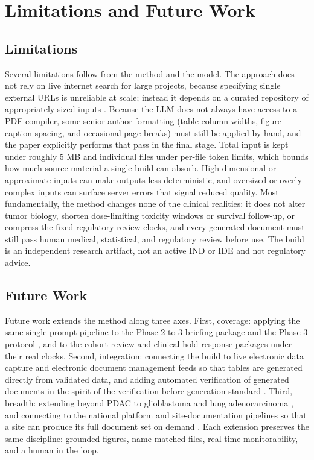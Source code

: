 \section{Limitations and Future Work}

\subsection{Limitations}

Several limitations follow from the method and the model. The approach does not rely
on live internet search for large projects, because specifying single external URLs
is unreliable at scale; instead it depends on a curated repository of appropriately
sized inputs \cite{adoptionguide}. Because the LLM does not always have access to a
PDF compiler, some senior-author formatting (table column widths, figure-caption
spacing, and occasional page breaks) must still be applied by hand, and the paper
explicitly performs that pass in the final stage. Total input is kept under roughly
5 MB and individual files under per-file token limits, which bounds how much source
material a single build can absorb. High-dimensional or approximate inputs can make
outputs less deterministic, and oversized or overly complex inputs can surface server
errors that signal reduced quality. Most fundamentally, the method changes none of
the clinical realities: it does not alter tumor biology, shorten dose-limiting
toxicity windows or survival follow-up, or compress the fixed regulatory review
clocks, and every generated document must still pass human medical, statistical, and
regulatory review before use. The build is an independent research artifact, not an
active IND or IDE and not regulatory advice.

\subsection{Future Work}

Future work extends the method along three axes. First, coverage: applying the same
single-prompt pipeline to the Phase 2-to-3 briefing package and the Phase 3 protocol
\cite{phase2protocol}, and to the cohort-review and clinical-hold response packages
under their real clocks. Second, integration: connecting the build to live electronic
data capture and electronic document management feeds so that tables are generated
directly from validated data, and adding automated verification of generated
documents in the spirit of the verification-before-generation standard
\cite{hr9510v5}. Third, breadth: extending beyond PDAC to glioblastoma and lung
adenocarcinoma \cite{gbmsynergy, lungadeno}, and connecting to the national platform
and site-documentation pipelines so that a site can produce its full document set on
demand \cite{natplatform}. Each extension preserves the same discipline: grounded
figures, name-matched files, real-time monitorability, and a human in the loop.
